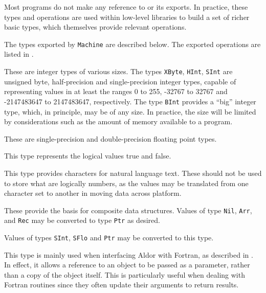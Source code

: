 Most programs do not make any reference to  or its exports.
In practice, these types and operations are used within low-level libraries
to build a set of richer basic types,
which themselves provide relevant operations.

The types exported by \verb+Machine+ are described below.
The exported operations are listed in .

%
%
These are integer types of various sizes.  
The types \verb"XByte", \verb"HInt", \verb"SInt" are
unsigned byte, half-precision and single-precision integer types,
capable of representing values in at least the ranges
0 to 255, -32767 to 32767 and -2147483647 to 2147483647, respectively.
The type \verb"BInt" provides a ``big'' integer type, which, in principle,
may be of any size.  In practice, the size will be limited by considerations
such as the amount of memory available to a program.

%
These are single-precision and double-precision floating point types.

%
This type represents the logical values true and false.

%
This type provides characters for natural language text.  
These should not be used to store what are logically numbers,
as the values may be translated from one character set to another
in moving data across platform.


%
%
These provide the basis for composite data structures.
Values of type \verb"Nil", \verb"Arr", and \verb"Rec" may
be converted to type \verb"Ptr" as desired.

%
Values of types
\verb"SInt", \verb"SFlo" and \verb"Ptr" may be converted to this type.

%

This type is mainly used when interfacing Aldor with Fortran, as described
in . 
In effect, it allows a reference to an object
to be passed as a parameter, rather than a copy of the object itself.  This
is particularly useful when dealing with Fortran routines since they often
update their arguments to return results.

